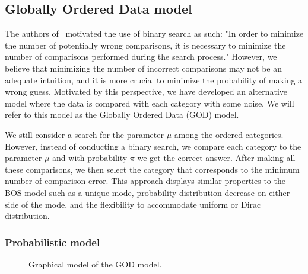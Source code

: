 \subsection{Globally Ordered Data model}



The authors of~\cite{biernacki2016model} motivated the use of binary search as such: "In order to minimize the number of potentially wrong comparisons, it
is necessary to minimize the number of comparisons performed during the search process." However, we believe that minimizing the number of incorrect comparisons may not be an adequate intuition, and it is more crucial to minimize the probability of making a wrong guess. Motivated by this perspective, we have developed an alternative model where the data is compared with each category with some noise. We will refer to this model as the Globally Ordered Data (GOD) model.

We still consider a search for the parameter $\mu$ among the ordered categories. However, instead of conducting a binary search, we compare each category to the parameter $\mu$ and with probability $\pi$ we get the correct answer. After making all these comparisons, we then select the category that corresponds to the minimum number of comparison error. This approach displays similar properties to the BOS model such as a unique mode, probability distribution decrease on either side of the mode, and the flexibility to accommodate uniform or Dirac distribution.

\subsubsection{Probabilistic model}

\begin{figure}[htbp]
    \centering
    \caption{Graphical model of the GOD model.}
    \label{fig:god_graphical_model}
\end{figure}
    

